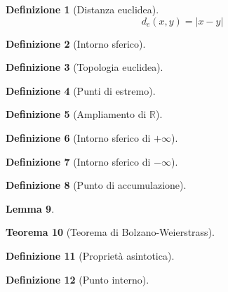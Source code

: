\documentclass[a4paper,12pt]{report}
\theoremstyle{mystyle}
\newtheorem{theorem}{Teorema}[section]
\newtheorem{definition}[theorem]{Definizione}
\newtheorem{lemma}[theorem]{Lemma}
\begin{document}
\begin{definition}[Distanza euclidea]
    \[d_e (x,y) = \lvert x-y \rvert\]
\end{definition}

\begin{definition}[Intorno sferico]
    
\end{definition}

\begin{definition}[Topologia euclidea]
    
\end{definition}

\begin{definition}[Punti di estremo]
    
\end{definition}

\begin{definition}[Ampliamento di \(\mathbb R\)]
    
\end{definition}

\begin{definition}[Intorno sferico di \(+\infty\)]
    
\end{definition}

\begin{definition}[Intorno sferico di \(-\infty\)]
    
\end{definition}

\begin{definition}[Punto di accumulazione]
    
\end{definition}

\begin{lemma}
    
\end{lemma}

\begin{theorem}[Teorema di Bolzano-Weierstrass]
    
\end{theorem}

\begin{definition}[Proprietà asintotica] %
    
\end{definition}

\begin{definition}[Punto interno]
    
\end{definition}
\end{document}
